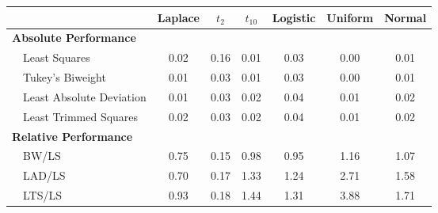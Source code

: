 %
\begin{center}
\begin{tabular}{|l||c|c|c|c|c|c|} \hline
\multicolumn{1}{|l||}{}&\multicolumn{1}{c|}{Laplace}&\multicolumn{1}{c|}{$t_2$}&\multicolumn{1}{c|}{$t_{10}$}&\multicolumn{1}{c|}{Logistic}&\multicolumn{1}{c|}{Uniform}&\multicolumn{1}{c|}{Normal}\\ \hline
{\bf Absolute Performance}&&&&&&\\
~~Least Squares&0.02&0.16&0.01&0.03&0.00&0.01\\ 
~~Tukey's Biweight&0.01&0.03&0.01&0.03&0.00&0.01\\ 
~~Least Absolute Deviation&0.01&0.03&0.02&0.04&0.01&0.02\\ 
~~Least Trimmed Squares&0.02&0.03&0.02&0.04&0.01&0.02\\ \hline
{\bf Relative Performance}&&&&&&\\
~~BW/LS&0.75&0.15&0.98&0.95&1.16&1.07\\ 
~~LAD/LS&0.70&0.17&1.33&1.24&2.71&1.58\\ 
~~LTS/LS&0.93&0.18&1.44&1.31&3.88&1.71\\ 
\hline
\end{tabular}
\end{center}
